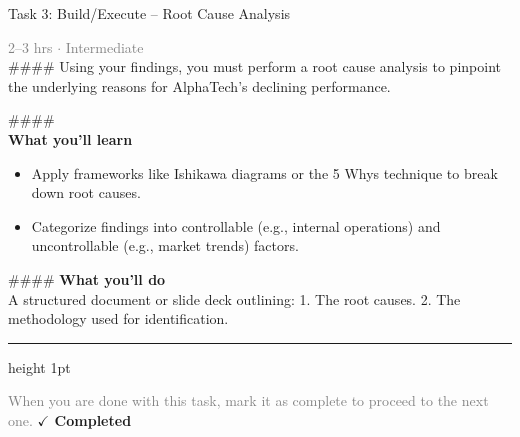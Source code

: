 \documentclass[10pt,a4paper]{article}
\begin{document}
\begin{taskbox}{Task 3: Build/Execute – Root Cause Analysis}

    {\small \textcolor{gray}{2--3 hrs $\cdot$ Intermediate}}\\[12pt]

    \#\#\#\#   
Using your findings, you must perform a root cause analysis to pinpoint the underlying reasons for AlphaTech’s declining performance.  

\#\#\#\# \\[10pt]
\vspace{8pt}
{\large \textbf{\textcolor{brandLight}{What you'll learn}}}\\[4pt]  
\begin{itemize}
    \item Apply frameworks like Ishikawa diagrams or the 5 Whys technique to break down root causes.  
    \item Categorize findings into controllable (e.g., internal operations) and uncontrollable (e.g., market trends) factors.  
\end{itemize}

\#\#\#\# \vspace{8pt}
{\large \textbf{\textcolor{brandLight}{What you'll do}}}\\[4pt]  
A structured document or slide deck outlining:  
1. The root causes.  
2. The methodology used for identification.\par

    \vspace{16pt}

    \textcolor{cardBorder}{\hrule height 1pt}\vspace{8pt}

    \small \textcolor{gray}{When you are done with this task, mark it as complete to proceed to the next one.} \hfill \textbf{\textcolor{brandDark}{$\checkmark$ Completed}}

\end{taskbox}
\end{document}
